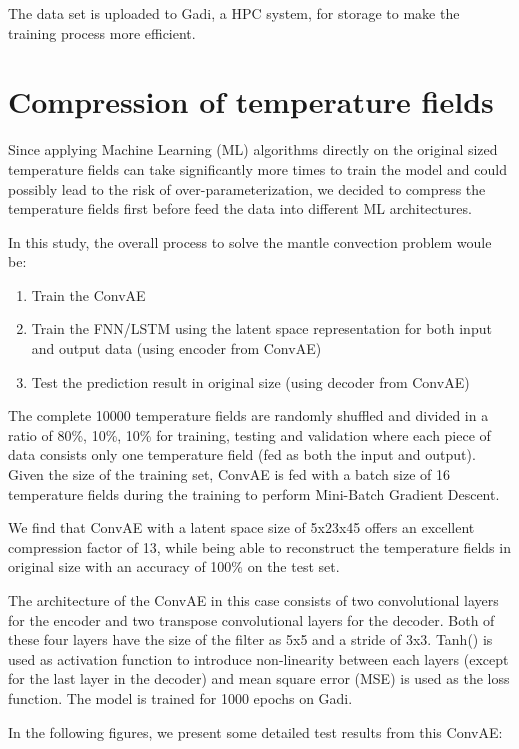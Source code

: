 The data set is uploaded to Gadi, a HPC system, for storage to make the training process more efficient. 

\section{Compression of temperature fields}

Since applying Machine Learning (ML) algorithms directly on the original sized temperature fields can take significantly more times to train the model and could possibly lead to the risk of over-parameterization, we decided to compress the temperature fields first before feed the data into different ML architectures.

In this study, the overall process to solve the mantle convection problem woule be: 

\begin{enumerate}
  \item Train the ConvAE
  \item Train the FNN/LSTM using the latent space representation for both input and output data (using encoder from ConvAE)
  \item Test the prediction result in original size (using decoder from ConvAE)
\end{enumerate}

The complete 10000 temperature fields are randomly shuffled and divided in a ratio of 80\%, 10\%, 10\% for training, testing and validation where each piece of data consists only one temperature field (fed as both the input and output). Given the size of the training set, ConvAE is fed with a batch size of 16 temperature fields during the training to perform Mini-Batch Gradient Descent.

We find that ConvAE with a latent space size of 5x23x45 offers an excellent compression factor of 13, while being able to reconstruct the temperature fields in original size with an accuracy of 100\% on the test set.

The architecture of the ConvAE in this case consists of two convolutional layers for the encoder and two transpose convolutional layers for the decoder. Both of these four layers have the size of the filter as 5x5 and a stride of 3x3. Tanh() is used as activation function to introduce non-linearity between each layers (except for the last layer in the decoder) and mean square error (MSE) is used as the loss function. The model is trained for 1000 epochs on Gadi.

In the following figures, we present some detailed test results from this ConvAE:

